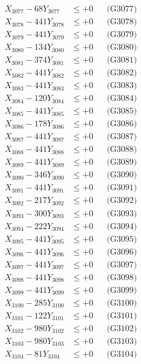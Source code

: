 \documentclass[a4paper,10pt]{article}
\begin{document}
{\begin{align}
X_{3077} - 68Y_{3077} &\leq +0 && \text{(G3077)} \\
X_{3078} - 441Y_{3078} &\leq +0 && \text{(G3078)} \\
X_{3079} - 441Y_{3079} &\leq +0 && \text{(G3079)} \\
X_{3080} - 134Y_{3080} &\leq +0 && \text{(G3080)} \\
\allowbreak
X_{3081} - 374Y_{3081} &\leq +0 && \text{(G3081)} \\
X_{3082} - 441Y_{3082} &\leq +0 && \text{(G3082)} \\
X_{3083} - 441Y_{3083} &\leq +0 && \text{(G3083)} \\
X_{3084} - 120Y_{3084} &\leq +0 && \text{(G3084)} \\
X_{3085} - 441Y_{3085} &\leq +0 && \text{(G3085)} \\
X_{3086} - 178Y_{3086} &\leq +0 && \text{(G3086)} \\
X_{3087} - 441Y_{3087} &\leq +0 && \text{(G3087)} \\
X_{3088} - 441Y_{3088} &\leq +0 && \text{(G3088)} \\
X_{3089} - 441Y_{3089} &\leq +0 && \text{(G3089)} \\
X_{3090} - 346Y_{3090} &\leq +0 && \text{(G3090)} \\
\allowbreak
X_{3091} - 441Y_{3091} &\leq +0 && \text{(G3091)} \\
X_{3092} - 217Y_{3092} &\leq +0 && \text{(G3092)} \\
X_{3093} - 300Y_{3093} &\leq +0 && \text{(G3093)} \\
X_{3094} - 222Y_{3094} &\leq +0 && \text{(G3094)} \\
X_{3095} - 441Y_{3095} &\leq +0 && \text{(G3095)} \\
X_{3096} - 441Y_{3096} &\leq +0 && \text{(G3096)} \\
X_{3097} - 441Y_{3097} &\leq +0 && \text{(G3097)} \\
X_{3098} - 441Y_{3098} &\leq +0 && \text{(G3098)} \\
X_{3099} - 441Y_{3099} &\leq +0 && \text{(G3099)} \\
X_{3100} - 285Y_{3100} &\leq +0 && \text{(G3100)} \\
\allowbreak
X_{3101} - 122Y_{3101} &\leq +0 && \text{(G3101)} \\
X_{3102} - 980Y_{3102} &\leq +0 && \text{(G3102)} \\
X_{3103} - 980Y_{3103} &\leq +0 && \text{(G3103)} \\
X_{3104} - 81Y_{3104} &\leq +0 && \text{(G3104)} \\

\end{align}}
\end{document}
